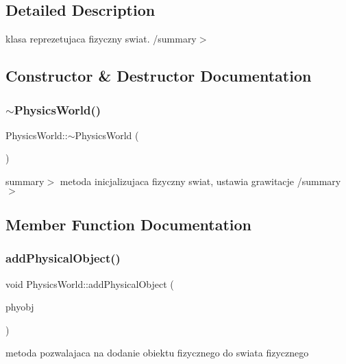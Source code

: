 \subsection{Detailed Description}
klasa reprezetujaca fizyczny swiat. /summary$>$ 

\subsection{Constructor \& Destructor Documentation}
\mbox{\label{class_physics_world_abf1573b008b52b60a83a8f36cbdd51bc}} 
\subsubsection{\texorpdfstring{$\sim$\+Physics\+World()}{~PhysicsWorld()}}
{\footnotesize\ttfamily Physics\+World\+::$\sim$\+Physics\+World (\begin{DoxyParamCaption}{ }\end{DoxyParamCaption})}

summary$>$ metoda inicjalizujaca fizyczny swiat, ustawia grawitacje /summary$>$ 

\subsection{Member Function Documentation}
\mbox{\label{class_physics_world_aa97ff9b7388afe747b447b42aeccfb8c}} 
\subsubsection{\texorpdfstring{add\+Physical\+Object()}{addPhysicalObject()}}
{\footnotesize\ttfamily void Physics\+World\+::add\+Physical\+Object (\begin{DoxyParamCaption}\item[{\hyperlink{class_physical_object}{Physical\+Object} $\ast$}]{phyobj }\end{DoxyParamCaption})}



metoda pozwalajaca na dodanie obiektu fizycznego do swiata fizycznego 

